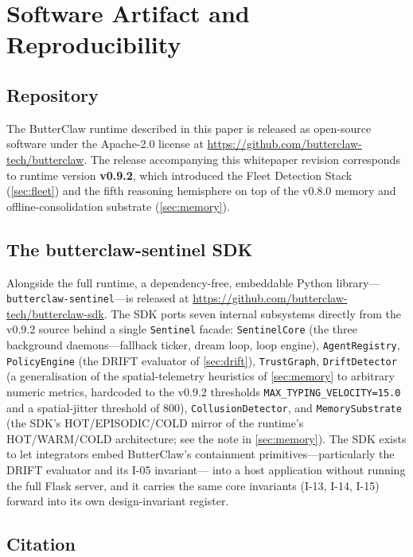 \documentclass[11pt,a4paper]{article}
\begin{document}
\section{Software Artifact and Reproducibility}
\label{sec:artifact}

\subsection{Repository}

The ButterClaw runtime described in this paper is released as open-source software under the
Apache-2.0 license at \url{https://github.com/butterclaw-tech/butterclaw}. The release
accompanying this whitepaper revision corresponds to runtime version \textbf{v0.9.2}, which
introduced the Fleet Detection Stack (\cref{sec:fleet}) and the fifth reasoning hemisphere on top
of the v0.8.0 memory and offline-consolidation substrate (\cref{sec:memory}).

\subsection{The butterclaw-sentinel SDK}
\label{sec:sdk}

Alongside the full runtime, a dependency-free, embeddable Python library---
\texttt{butterclaw-sentinel}---is released at
\url{https://github.com/butterclaw-tech/butterclaw-sdk}. The SDK ports seven internal subsystems
directly from the v0.9.2 source behind a single \texttt{Sentinel} facade: \texttt{SentinelCore}
(the three background daemons---fallback ticker, dream loop, loop engine), \texttt{AgentRegistry},
\texttt{PolicyEngine} (the DRIFT evaluator of \cref{sec:drift}), \texttt{TrustGraph},
\texttt{DriftDetector} (a generalisation of the spatial-telemetry heuristics of
\cref{sec:memory} to arbitrary numeric metrics, hardcoded to the v0.9.2 thresholds
\texttt{MAX\_TYPING\_VELOCITY=15.0} and a spatial-jitter threshold of 800), \texttt{CollusionDetector},
and \texttt{MemorySubstrate} (the SDK's HOT/EPISODIC/COLD mirror of the runtime's HOT/WARM/COLD
architecture; see the note in \cref{sec:memory}). The SDK exists to let integrators embed
ButterClaw's containment primitives---particularly the DRIFT evaluator and its I-05 invariant---
into a host application without running the full Flask server, and it carries the same core
invariants (I-13, I-14, I-15) forward into its own design-invariant register.

\subsection{Citation}
\end{document}
